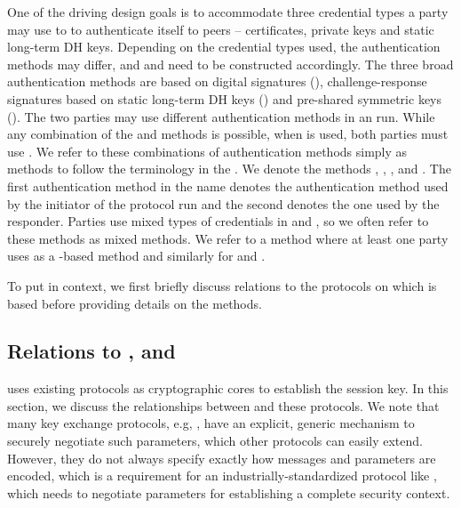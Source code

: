 One of the driving design goals is to accommodate three credential types
a party may use to to authenticate itself to peers -- certificates, private keys
and static long-term DH keys. Depending on the credential types used, the authentication methods may differ, and \mAuthi{} and \mAuthr{} need to be constructed accordingly.
%
%
The three broad authentication methods are based on digital signatures (\mSig), challenge-response signatures based on static long-term DH keys (\mStat) and pre-shared symmetric keys (\mPsk). The two parties may use different authentication methods in an \mEdhoc{} run.
%
While any combination of the \mSig{} and \mStat{} methods is possible, when \mPsk{} is used, both parties must use \mPsk{}.
%
We refer to these combinations of authentication methods simply as methods to follow the terminology in the \mSpec{}.
%
We denote the methods \mSigSig, \mSigStat, \mStatStat, \mStatSig{} and \mPskPsk.
%
The first authentication method in the name denotes the authentication method used by the initiator of the protocol run and the second denotes the one used by the responder.
%
Parties use mixed types of credentials in \mSigStat{} and \mStatSig{}, so
we often refer to these methods as mixed methods.
%
We refer to a method where at least one party uses \mSig{} as a \mSig-based method and similarly for \mStat{} and \mPsk.
%

To put \mEdhoc{} in context, we first briefly discuss relations to
the protocols on which \mEdhoc{} is based before providing details on the
methods.
%

\spacehack
\subsection{Relations to \mSigma, \mOptls{} and \mNoise{}}
\label{sec:relationsToOtherProtocols}
\fillhack
\mEdhoc{} uses existing protocols as cryptographic cores to
establish the session key. In this section, we discuss the relationships between \mEdhoc{} and these protocols.
%
%
%
We note that many key exchange protocols, e.g, \mSigma{}, have an explicit, generic mechanism to securely negotiate such parameters, which other protocols can easily extend. However, they do not always specify exactly how messages and parameters are encoded, which is a requirement for an industrially-standardized protocol like \mEdhoc{}, which needs to negotiate parameters for establishing a complete \mOscore{} security context.
%
%

